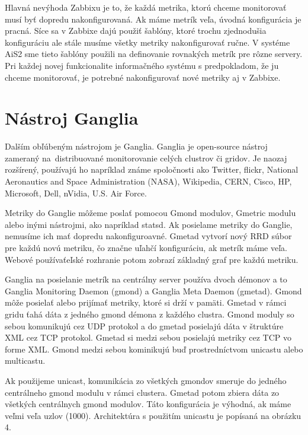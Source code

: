 \documentclass[a4paper, upjsfrontpage, thesismargins, thesislinespacing]{rnthesis}
\begin{document}
Hlavná nevýhoda Zabbixu je to, že každá metrika, ktorú chceme monitorovať musí byť dopredu nakonfigurovaná.
Ak máme metrík veľa, úvodná konfigurácia je pracná.
Síce sa v Zabbixe dajú použiť šablóny, ktoré trochu zjednodušia konfiguráciu ale stále musíme všetky metriky nakonfigurovať ručne.
V systéme AiS2 sme tieto šablóny použili na definovanie rovnakých metrík pre rôzne servery.
Pri každej novej funkcionalite informačného systému s predpokladom, že ju chceme monitorovať, je potrebné nakonfigurovať nové metriky aj v Zabbixe.

\section{Nástroj Ganglia}

Dalším obľúbeným nástrojom je Ganglia.
Ganglia je open-source nástroj zameraný na~distribuované monitorovanie celých clustrov či gridov.
Je naozaj rozšírený, používajú ho napríklad známe spoločnosti ako Twitter, flickr, National Aeronautics and Space Administration (NASA), Wikipedia, CERN, Cisco, HP, Microsoft, Dell, nVidia, U.S. Air Force.

Metriky do Ganglie môžeme poslať pomocou Gmond modulov, Gmetric modulu alebo inými nástrojmi, ako napríklad statsd.
Ak posielame metriky do Ganglie, nemusíme ich mať dopredu nakonfiguroavné.
Gmetad vytvorí nový RRD súbor pre každú novú metriku, čo značne uľahčí konfiguráciu, ak metrík máme veľa.
Webové používaťeľské rozhranie potom zobrazí základný graf pre každú metriku.

Ganglia na posielanie metrík na centrálny server používa dvoch démonov a to Ganglia Monitoring Daemon (gmond) a Ganglia Meta Daemon (gmetad).
Gmond môže posielať alebo prijímať metriky, ktoré si drží v pamäti.
Gmetad v rámci gridu ťahá dáta z jedného gmond démona z každého clustra.
Gmond moduly so sebou komunikujú cez UDP protokol a do gmetad posielajú dáta v štruktúre XML cez TCP protokol.
Gmetad si medzi sebou posielajú metriky cez TCP vo forme XML.
Gmond medzi sebou kominikujú buď prostredníctvom unicastu alebo multicastu.

Ak použijeme unicast, komunikácia zo všetkých gmondov smeruje do jedného centrálneho gmond modulu v rámci clustera.
Gmetad potom zbiera dáta zo všetkých centrálnych gmond modulov.
Táto konfigurácia je výhodná, ak máme veľmi veľa uzlov (1000).
Architektúra s použitím unicastu je popísaná na obrázku 4.
\end{document}
